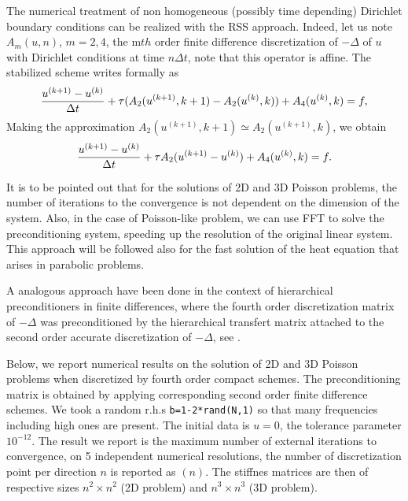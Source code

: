 {The numerical treatment of non homogeneous (possibly time depending) Dirichlet boundary conditions can be realized with the RSS approach.  Indeed, let us note $A_m(u,n)$, $m=2,4$, the m$th$ order finite difference discretization of $-\Delta$ of $u$  with Dirichlet conditions at time $n\Delta t$, note that this operator is affine. The stabilized scheme writes  formally as
\begin{equation}
\frac{\textstyle u^{(k+1)}-u^{(k)}} {\textstyle \Delta t}+\tau
(A_2(u^{(k+1)},k+1)-A_2(u^{(k)},k))+A_4(u^{(k)},k)=f,
\end{equation}
Making the approximation $A_2(u^{(k+1)},k+1)\simeq A_2(u^{(k+1)},k)$, we obtain
\begin{equation}
\frac{\textstyle u^{(k+1)}-u^{(k)}} {\textstyle \Delta t}+\tau
A_2(u^{(k+1)}-u^{(k)})+A_4(u^{(k)},k)=f.
\end{equation}

It is to be pointed out that for the solutions of 2D and 3D Poisson problems,  the number of iterations to  the convergence is not dependent on the dimension of the system. Also, in the case of Poisson-like problem, we can use FFT to solve the preconditioning system, speeding up the resolution of the original linear system. This approach will be followed also  for the fast solution of the heat equation that arises in parabolic problems.
\begin{remark}
A analogous approach have been done in the context of hierarchical preconditioners in finite differences, where the fourth order discretization matrix of $-\Delta$ was preconditioned by the hierarchical transfert matrix attached to the second order accurate discretization of $-\Delta$, see \cite{ChehabCS}.
\end{remark}

Below, we report numerical results on the solution of 2D and 3D Poisson problems when discretized by fourth order compact schemes. The preconditioning matrix is obtained by applying  corresponding second order finite difference schemes. We took a random r.h.s {\tt b=1-2*rand(N,1)} so that many frequencies including high ones are present. The initial data is $u=0$, the tolerance parameter $10^{-12}$. The result we report is the maximum number of external iterations to convergence, on 5 independent numerical resolutions, the number of discretization point per direction $n$  is reported as $(n)$.   The stiffnes matrices are then of respective sizes $n^2\times n^2$ (2D problem) and
$n^3\times n^3$ (3D problem).

\begin{table}[!ht]
\begin{center}


\end{center}
\end{table}}

